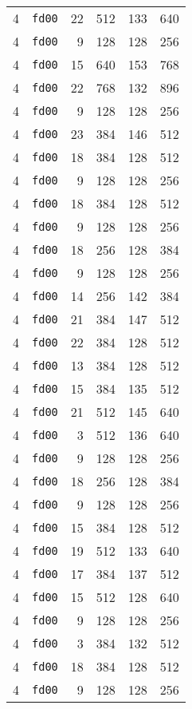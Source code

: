 \documentclass{article}
\begin{document}
\begin{table}[h!]
\begin{tabular}{llrrrl}
    4 & \texttt{fd00} & 22 & 512 & 133 & 640 \\
    4 & \texttt{fd00} & 9 & 128 & 128 & 256 \\
    4 & \texttt{fd00} & 15 & 640 & 153 & 768 \\
    4 & \texttt{fd00} & 22 & 768 & 132 & 896 \\
    4 & \texttt{fd00} & 9 & 128 & 128 & 256 \\
    4 & \texttt{fd00} & 23 & 384 & 146 & 512 \\
    4 & \texttt{fd00} & 18 & 384 & 128 & 512 \\
    4 & \texttt{fd00} & 9 & 128 & 128 & 256 \\
    4 & \texttt{fd00} & 18 & 384 & 128 & 512 \\
    4 & \texttt{fd00} & 9 & 128 & 128 & 256 \\
    4 & \texttt{fd00} & 18 & 256 & 128 & 384 \\
    4 & \texttt{fd00} & 9 & 128 & 128 & 256 \\
    4 & \texttt{fd00} & 14 & 256 & 142 & 384 \\
    4 & \texttt{fd00} & 21 & 384 & 147 & 512 \\
    4 & \texttt{fd00} & 22 & 384 & 128 & 512 \\
    4 & \texttt{fd00} & 13 & 384 & 128 & 512 \\
    4 & \texttt{fd00} & 15 & 384 & 135 & 512 \\
    4 & \texttt{fd00} & 21 & 512 & 145 & 640 \\
    4 & \texttt{fd00} & 3 & 512 & 136 & 640 \\
    4 & \texttt{fd00} & 9 & 128 & 128 & 256 \\
    4 & \texttt{fd00} & 18 & 256 & 128 & 384 \\
    4 & \texttt{fd00} & 9 & 128 & 128 & 256 \\
    4 & \texttt{fd00} & 15 & 384 & 128 & 512 \\
    4 & \texttt{fd00} & 19 & 512 & 133 & 640 \\
    4 & \texttt{fd00} & 17 & 384 & 137 & 512 \\
    4 & \texttt{fd00} & 15 & 512 & 128 & 640 \\
    4 & \texttt{fd00} & 9 & 128 & 128 & 256 \\
    4 & \texttt{fd00} & 3 & 384 & 132 & 512 \\
    4 & \texttt{fd00} & 18 & 384 & 128 & 512 \\
    4 & \texttt{fd00} & 9 & 128 & 128 & 256 \\

\end{tabular}
\end{table}
\end{document}
